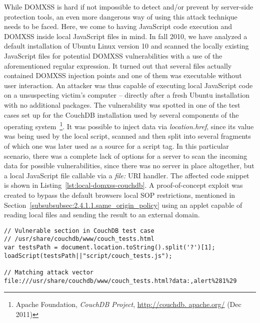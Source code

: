     While DOMXSS is hard if not impossible to detect and/or prevent by server-side protection tools, an even more dangerous way of using this attack technique needs to be faced. Here, we come to having JavaScript code execution and DOMXSS inside local JavaScript files in mind. In fall 2010, we have analyzed a default installation of Ubuntu Linux version 10 and scanned the locally existing JavaScript files for potential DOMXSS vulnerabilities with a use of the aforementioned regular expression. It turned out that several files actually contained DOMXSS injection points and one of them was executable without user interaction. An attacker was thus capable of executing local JavaScript code on a unsuspecting victim's computer -- directly after a fresh Ubuntu installation with no additional packages. The vulnerability was spotted in one of the test cases set up for the CouchDB installation used by several components of the operating system~\footnote{Apache Foundation, \textit{CouchDB Project}, \url{http://couchdb.
apache.org/} (Dec 2011)}. It was possible to inject data via \textit{location.href}, since its value was being used by the local script, scanned and then split into several fragments of which one was later used as a source for a script tag. In this particular scenario, there was a complete lack of options for a server to scan the incoming data for possible vulnerabilities, since there was no server in place altogether, but a local JavaScript file callable via a \textit{file:} URI handler. The affected code snippet is shown in Listing~\ref{lst:local-domxss-couchdb}. A proof-of-concept exploit was created to bypass the default browsers local SOP restrictions, mentioned in Section~\ref{subsubsubsec:2.4.1.1.same_origin_policy} using an applet capable of reading local files and sending the result to an external domain. \\

\begin{lstlisting}[label=lst:local-domxss-couchdb,caption=Local DOMXSS vulnerability and exploit in CouchDB Testsuite discovered during our DOMXSS research,captionpos=b]
// Vulnerable section in CouchDB test case 
// /usr/share/couchdb/www/couch_tests.html
var testsPath = document.location.toString().split('?')[1];
loadScript(testsPath||"script/couch_tests.js");

// Matching attack vector
file:///usr/share/couchdb/www/couch_tests.html?data:,alert%281%29
\end{lstlisting}

